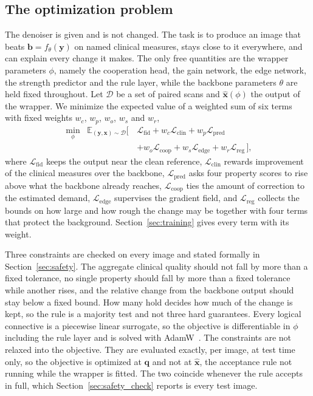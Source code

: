 \subsection{The optimization problem}
\label{sec:optimization}
The denoiser is given and is not changed. The task is to produce an image that beats
$\mathbf{b} = f_\theta(\mathbf{y})$ on named clinical measures, stays close to it everywhere, and can
explain every change it makes. The only free quantities are the wrapper parameters $\phi$, namely the
cooperation head, the gain network, the edge network, the strength predictor and the rule layer, while
the backbone parameters $\theta$ are held fixed throughout. Let $\mathcal{D}$ be a set of paired scans
and $\hat{\mathbf{x}}(\phi)$ the output of the wrapper. We minimize the expected value of a weighted
sum of six terms with fixed weights $w_c$, $w_p$, $w_o$, $w_s$ and $w_r$,
\begin{equation}
\begin{split}
\min_{\phi}\;\; \mathbb{E}_{(\mathbf{y},\mathbf{x}) \sim \mathcal{D}}
\Big[\, &\mathcal{L}_{\mathrm{fid}} + w_c \mathcal{L}_{\mathrm{clin}}
       + w_p \mathcal{L}_{\mathrm{pred}} \\
      &+ w_o \mathcal{L}_{\mathrm{coop}} + w_s \mathcal{L}_{\mathrm{edge}}
       + w_r \mathcal{L}_{\mathrm{reg}} \,\Big],
\end{split}
\label{eq:objective}
\end{equation}
where $\mathcal{L}_{\mathrm{fid}}$ keeps the output near the clean reference,
$\mathcal{L}_{\mathrm{clin}}$ rewards improvement of the clinical measures over the backbone,
$\mathcal{L}_{\mathrm{pred}}$ asks four property scores to rise above what the backbone already
reaches, $\mathcal{L}_{\mathrm{coop}}$ ties the amount of correction to the estimated demand,
$\mathcal{L}_{\mathrm{edge}}$ supervises the gradient field, and $\mathcal{L}_{\mathrm{reg}}$
collects the bounds on how large and how rough the change may be together with four terms that
protect the background. Section~\ref{sec:training} gives every term with its weight.

Three constraints are checked on every image and stated formally in Section~\ref{sec:safety}. The
aggregate clinical quality should not fall by more than a fixed tolerance, no single property should
fall by more than a fixed tolerance while another rises, and the relative change from the backbone
output should stay below a fixed bound. How many hold decides how much of the change is kept, so the
rule is a majority test and not three hard guarantees. Every logical connective is a piecewise linear
surrogate, so the objective is differentiable in $\phi$ including the rule layer and is solved with
AdamW~\cite{loshchilov2019decoupled}. The constraints are not relaxed into the objective.
They are evaluated exactly, per image, at test time only, so the objective is optimized at
$\mathbf{q}$ and not at $\hat{\mathbf{x}}$, the acceptance rule not running while the wrapper is
fitted. The two coincide whenever the rule accepts in full, which
Section~\ref{sec:safety_check} reports is every test image.

